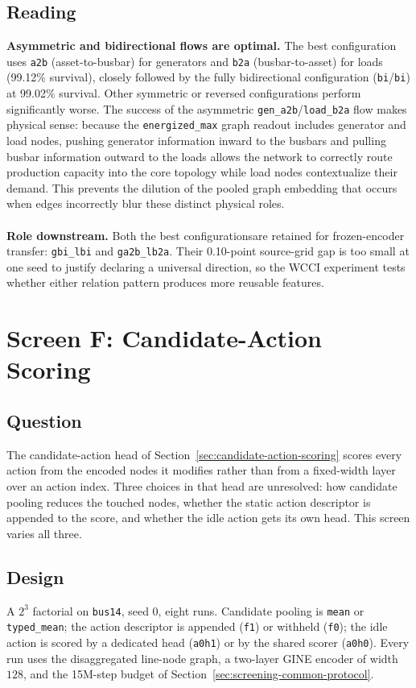\subsection*{Reading}

\textbf{Asymmetric and bidirectional flows are optimal.} The best configuration uses \texttt{a2b} (asset-to-busbar) for generators and \texttt{b2a} (busbar-to-asset) for loads (99.12\% survival), closely followed by the fully bidirectional configuration (\texttt{bi}/\texttt{bi}) at 99.02\% survival. Other symmetric or reversed configurations perform significantly worse. The success of the asymmetric \texttt{gen\_a2b}/\texttt{load\_b2a} flow makes physical sense: because the \texttt{energized\_max} graph readout includes generator and load nodes, pushing generator information inward to the busbars and pulling busbar information outward to the loads allows the network to correctly route production capacity into the core topology while load nodes contextualize their demand. This prevents the dilution of the pooled graph embedding that occurs when edges incorrectly blur these distinct physical roles.
\\
\\
\noindent\textbf{Role downstream.} Both the best configurationsare retained for frozen-encoder transfer: \texttt{gbi\_lbi}
and \texttt{ga2b\_lb2a}. Their 0.10-point source-grid gap is too small at one
seed to justify declaring a universal direction, so the WCCI experiment tests
whether either relation pattern produces more reusable features.

\section{Screen F: Candidate-Action Scoring}
\label{sec:screen-f-cas}

\subsection*{Question}
The candidate-action head of Section~\ref{sec:candidate-action-scoring} scores
every action from the encoded nodes it modifies rather than from a fixed-width
layer over an action index. Three choices in that head are unresolved: how
candidate pooling reduces the touched nodes, whether the static action descriptor is appended to
the score, and whether the idle action gets its own head. This screen varies all
three.

\subsection*{Design}
A $2^3$ factorial on \texttt{bus14}, seed $0$, eight runs. Candidate pooling is
\texttt{mean} or \texttt{typed\_mean}; the action descriptor is appended
(\texttt{f1}) or withheld (\texttt{f0}); the idle action is scored by a
dedicated head (\texttt{a0h1}) or by the shared scorer (\texttt{a0h0}). Every
run uses the disaggregated line-node graph, a two-layer GINE
encoder of width $128$, and the 15M-step budget of
Section~\ref{sec:screening-common-protocol}.

